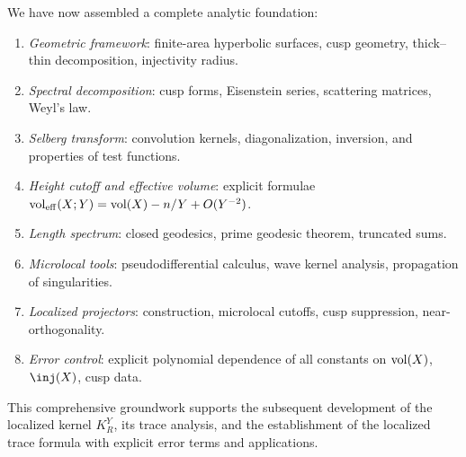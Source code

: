 We have now assembled a complete analytic foundation:
\begin{enumerate}
  \item \emph{Geometric framework}: finite-area hyperbolic surfaces, cusp geometry, thick–thin decomposition, injectivity radius.
  \item \emph{Spectral decomposition}: cusp forms, Eisenstein series, scattering matrices, Weyl’s law.
  \item \emph{Selberg transform}: convolution kernels, diagonalization, inversion, and properties of test functions.
  \item \emph{Height cutoff and effective volume}: explicit formulae $\operatorname{vol}_{\mathrm{eff}}(X;Y) = \operatorname{vol}(X)-n/Y+O(Y^{-2})$.
  \item \emph{Length spectrum}: closed geodesics, prime geodesic theorem, truncated sums.
  \item \emph{Microlocal tools}: pseudodifferential calculus, wave kernel analysis, propagation of singularities.
  \item \emph{Localized projectors}: construction, microlocal cutoffs, cusp suppression, near-orthogonality.
  \item \emph{Error control}: explicit polynomial dependence of all constants on $\operatorname{vol}(X)$, $\inj(X)$, cusp data.
\end{enumerate}

This comprehensive groundwork supports the subsequent development of the localized kernel $K_R^Y$, its trace analysis, and the establishment of the localized trace formula with explicit error terms and applications.
